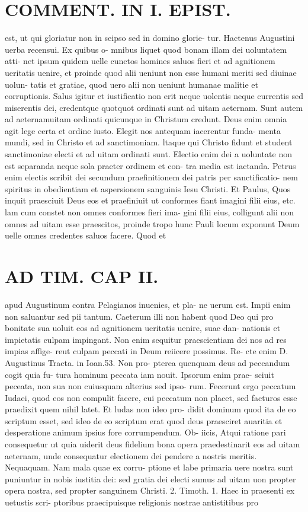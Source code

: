 \documentclass{article}
\begin{document}
\begin{pages}
\section*{COMMENT. IN I. EPIST. }\pstart est, ut qui gloriatur non in seipso sed in domino glorie- tur. Hactenus Augustini uerba recensui. Ex quibus o- mnibus liquet quod bonam illam dei uoluntatem atti- net ipsum quidem uelle cunctos homines saluos fieri et ad agnitionem ueritatis uenire, et proinde quod alii ueniunt non esse humani meriti sed diuinae uolun- tatis et gratiae, quod uero alii non ueniunt humanae malitie et corruptionis. Salus igitur et iustificatio non erit neque uolentis neque currentis sed miserentis dei, credentque quotquot ordinati sunt ad uitam aeternam. Sunt autem ad aeternamuitam ordinati quicunque in Christum credunt. Deus enim omnia agit lege certa et ordine iusto. Elegit nos antequam iacerentur funda- menta mundi, sed in Christo et ad sanctimoniam. ltaque qui Christo fidunt et student sanctimoniae electi et ad uitam ordinati sunt. Electio enim dei a uoluntate non est separanda neque sola praeter ordinem et con- tra media est iactanda. Petrus enim electis scribit dei secundum praefinitionem dei patris per sanctificatio- nem spiritus in obedientiam et aspersionem sanguinis Iesu Christi. Et Paulus, Quos inquit praesciuit Deus eos et praefiniuit ut conformes fiant imagini filii eius, etc. lam cum constet non omnes conformes fieri ima- gini filii eius, colligunt alii non omnes ad uitam esse praescitos, proinde tropo hunc Pauli locum exponunt Deum uelle omnes credentes saluos facere. Quod et  \pend
\section*{AD TIM. CAP II. }
\marginpar{[ p.115 ]}\pstart apud Augustinum contra Pelagianos inuenies, et pla- ne uerum est. Impii enim non saluantur sed pii tantum. Caeterum illi non habent quod Deo qui pro bonitate sua uoluit eos ad agnitionem ueritatis uenire, suae dan- nationis et impietatis culpam impingant. Non enim sequitur praescientiam dei nos ad res impias affige- reut culpam peccati in Deum reiicere possimus. Re- cte enim D. Augustinus Tracta. in Ioan.53. Non pro- pterea quenquam deus ad peccandum cogit quia fu- tura hominum peccata iam nouit. Ipsorum enim prae- sciuit peceata, non sua non cuiusquam alterius sed ipso- rum. Fecerunt ergo peccatum Iudaei, quod eos non compulit facere, cui peccatum non placet, sed facturos esse praedixit quem nihil latet. Et ludas non ideo pro- didit dominum quod ita de eo scriptum esset, sed ideo de eo scriptum erat quod deus praesciret auaritia et desperatione animum ipsius fore corrumpendum. Ob- iicis, Atqui ratione pari consequetur ut quia uiderit deus fidelium bona opera praedestinarit eos ad uitam aeternam, unde consequatur electionem dei pendere a nostris meritis. Nequaquam. Nam mala quae ex corru- ptione et labe primaria uere nostra sunt puniuntur in nobis iustitia dei: sed gratia dei electi sumus ad uitam uon propter opera nostra, sed propter sanguinem Christi. 2. Timoth. 1. Haec in praesenti ex uetustis scri- ptoribus praecipuisque religionis nostrae antistitibus pro  \pend

\end{pages}
\end{document}
